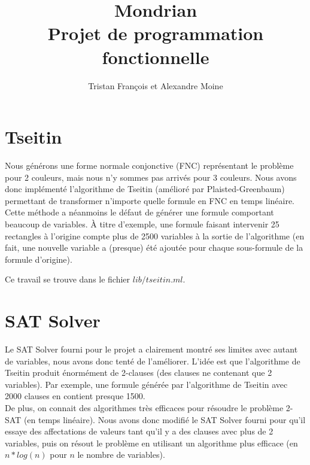 \documentclass[10pt,a4paper]{article}
\begin{document}
	\title{Mondrian \\
			\large Projet de programmation fonctionnelle}
	
	\author{Tristan François et Alexandre Moine}
	\maketitle

\section{Tseitin}
Nous générons une forme normale conjonctive (FNC) représentant le problème pour 2 couleurs, mais nous n'y sommes pas arrivés pour 3 couleurs. Nous avons donc implémenté l'algorithme de Tseitin (amélioré par Plaisted-Greenbaum) permettant de transformer n'importe quelle formule en FNC en temps linéaire.
Cette méthode a néanmoins le défaut de générer une formule comportant beaucoup de variables. À titre d'exemple, une formule faisant intervenir 25 rectangles à l'origine compte plus de 2500 variables à la sortie de l'algorithme (en fait, une nouvelle variable a (presque) été ajoutée pour chaque sous-formule de la formule d'origine).

Ce travail se trouve dans le fichier $lib/tseitin.ml$.

\section{SAT Solver}
Le SAT Solver fourni pour le projet a clairement montré ses limites avec autant de variables, nous avons donc tenté de l'améliorer. L'idée est que l'algorithme de Tseitin produit énormément de 2-clauses (des clauses ne contenant que 2 variables). Par exemple, une formule générée par l'algorithme de Tseitin avec 2000 clauses en contient presque 1500.\\
De plus, on connait des algorithmes très efficaces pour résoudre le problème 2-SAT (en temps linéaire). Nous avons donc modifié le SAT Solver fourni pour qu'il essaye des affectations de valeurs tant qu'il y a des clauses avec plus de 2 variables, puis on résout le problème en utilisant un algorithme plus efficace (en $n*log(n)$ pour $n$ le nombre de variables).
\end{document}
